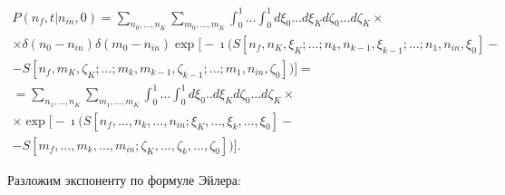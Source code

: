 \begin{multline}

\label{biruk:33}

P(n_f,t|n_{in}, 0)=\sum\limits_{n_{0},\dots,n_{K}}\sum\limits_{m_{0},\dots,m_{K}} \int _{0}^{1} \dots

\int _{0}^{1} d\xi_0\dots d\xi_Kd\zeta_0\dots d\zeta_K

\times

\\

\times

 \delta(n_0-n_{in})\delta(m_0-n_{in})

\exp\bigl[-\imath \bigl(S[n_f,n_{K},\xi_K;\dots ;n_k,n_{k-1},\xi_{k-1};\dots ;n_{1},n_{in},\xi_0]

-

\\

-

S[n_f,m_{K},\zeta_K;\dots ;m_k,m_{k-1},\zeta_{k-1};\dots ;m_{1},n_{in},\zeta_0] \bigr)\bigr]

=

\\

=

\sum\limits_{n_{1},\dots,n_{K}}\sum\limits_{m_{1},\dots,m_{K}} \int _{0}^{1} \dots \int _{0}^{1} d\xi_0..d\xi_Kd\zeta_0\dots d\zeta_K

\times

\\

\times

\exp\bigl[-\imath \bigl(S[n_f,\dots,n_k,\dots,n_{in};\xi_K,\dots,\xi_k,\dots,\xi_0]- \\

 -S[m_f,\dots,m_k,\dots,m_{in};\zeta_K,\dots,\zeta_k,\dots,\zeta_0]\bigr)\bigr]. 

\end{multline}

Разложим экспоненту по формуле Эйлера:

